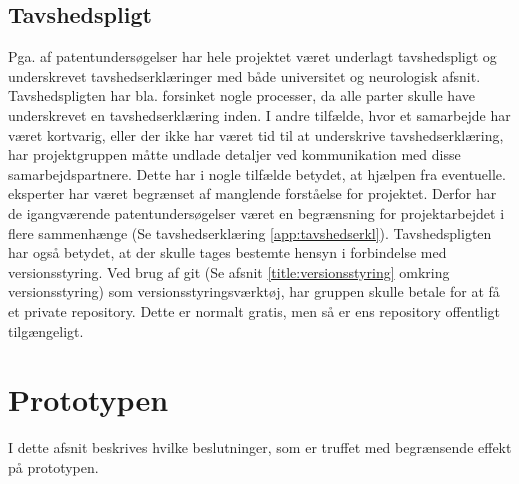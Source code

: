 \subsection{Tavshedspligt} \label{title:tavshedspligt}
Pga. af patentundersøgelser har hele projektet været underlagt tavshedspligt og underskrevet tavshedserklæringer med både universitet og neurologisk afsnit. Tavshedspligten har bla. forsinket nogle processer, da alle parter skulle have underskrevet en tavshedserklæring inden. I andre tilfælde, hvor et samarbejde har været kortvarig, eller der ikke har været tid til at underskrive tavshedserklæring, har projektgruppen måtte undlade detaljer ved kommunikation med disse samarbejdspartnere. Dette har i nogle tilfælde betydet, at hjælpen fra eventuelle. eksperter har været begrænset af manglende forståelse for projektet.  Derfor har de igangværende patentundersøgelser været en begrænsning for projektarbejdet i flere sammenhænge (Se tavshedserklæring \ref{app:tavshedserkl}).
Tavshedspligten har også betydet, at der skulle tages bestemte hensyn i forbindelse med versionsstyring. Ved brug af git (Se afsnit \ref{title:versionsstyring} omkring versionsstyring) som versionsstyringsværktøj, har gruppen skulle betale for at få et private repository. Dette er normalt gratis, men så er ens repository offentligt tilgængeligt.

\newpage
\section{Prototypen}
I dette afsnit beskrives hvilke beslutninger, som er truffet med begrænsende effekt på prototypen.

